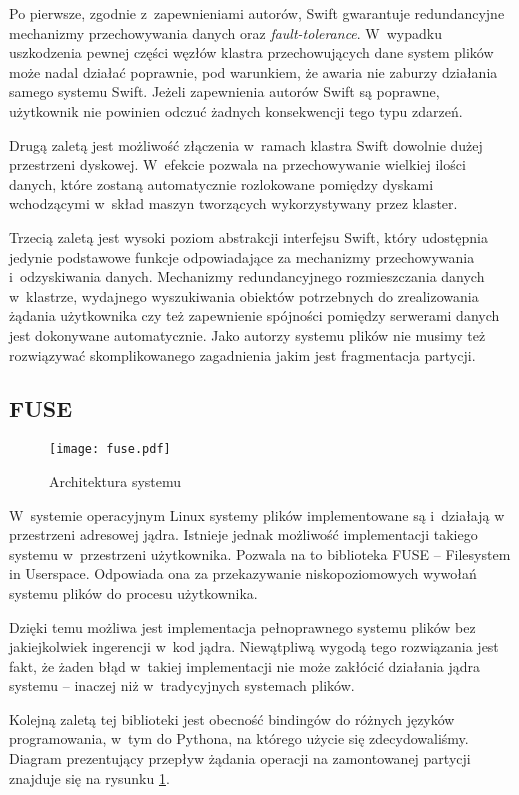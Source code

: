 Po pierwsze, zgodnie z~zapewnieniami autorów, Swift gwarantuje redundancyjne
mechanizmy przechowywania danych oraz \textit{fault-tolerance}. W~wypadku
uszkodzenia pewnej części węzłów klastra przechowujących dane system plików
\cb{} może nadal działać poprawnie, pod warunkiem, że awaria nie zaburzy
działania samego systemu Swift. Jeżeli zapewnienia autorów Swift są poprawne,
użytkownik nie powinien odczuć żadnych konsekwencji tego typu zdarzeń.

Drugą zaletą jest możliwość złączenia w~ramach klastra Swift dowolnie dużej
przestrzeni dyskowej. W~efekcie \cb{} pozwala na przechowywanie wielkiej ilości
danych, które zostaną automatycznie rozlokowane pomiędzy dyskami wchodzącymi
w~skład maszyn tworzących wykorzystywany przez \cb{} klaster.

Trzecią zaletą jest wysoki poziom abstrakcji interfejsu Swift, który udostępnia
jedynie podstawowe funkcje odpowiadające za mechanizmy przechowywania
i~odzyskiwania danych. Mechanizmy redundancyjnego rozmieszczania danych
w~klastrze, wydajnego wyszukiwania obiektów potrzebnych do zrealizowania żądania
użytkownika czy też zapewnienie spójności pomiędzy serwerami danych jest
dokonywane automatycznie. Jako autorzy systemu plików nie musimy też rozwiązywać
skomplikowanego zagadnienia jakim jest fragmentacja partycji.

\subsection{FUSE}

\begin{figure}
	\centering
	\texttt{[image: fuse.pdf]}
	\caption{Architektura systemu}
	\label{fig:fuse}
\end{figure}

W~systemie operacyjnym Linux systemy plików implementowane są i~działają w
przestrzeni adresowej jądra. Istnieje jednak możliwość implementacji takiego
systemu w~przestrzeni użytkownika. Pozwala na to biblioteka FUSE -- Filesystem
in Userspace. Odpowiada ona za przekazywanie niskopoziomowych wywołań systemu
plików do procesu użytkownika.

Dzięki temu możliwa jest implementacja pełnoprawnego systemu plików bez
jakiejkolwiek ingerencji w~kod jądra. Niewątpliwą wygodą tego rozwiązania
jest fakt, że żaden błąd w~takiej implementacji nie może zakłócić działania
jądra systemu -- inaczej niż w~tradycyjnych systemach plików.

Kolejną zaletą tej biblioteki jest obecność bindingów do różnych języków
programowania, w~tym do Pythona, na którego użycie się zdecydowaliśmy. Diagram
prezentujący przepływ żądania operacji na zamontowanej partycji znajduje się na
rysunku \ref{fig:fuse}.


